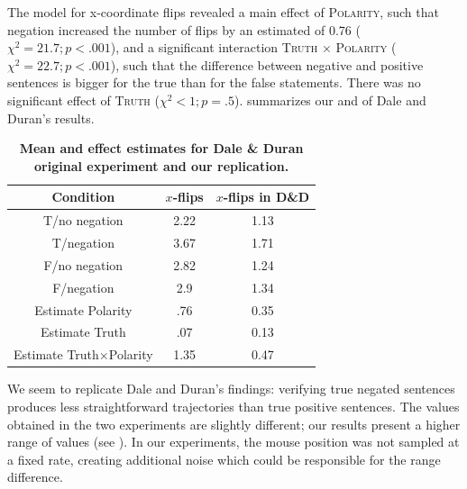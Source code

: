 \documentclass[11pt]{article}
\begin{document}

The model for x-coordinate flips revealed a main effect of \textsc{Polarity}, such that negation increased the number of flips by an estimated of 0.76 ($\chi^{2}=21.7; p<.001$), and a significant interaction \textsc{Truth} $\times$ \textsc{Polarity} ($\chi^{2}=22.7; p<.001$), such that the difference between negative and positive sentences is bigger for the true than for the false statements. There was no significant effect of \textsc{Truth} ($\chi^{2}<1; p=.5$). 
 summarizes our and of Dale and Duran's results. 

\begin{table}[h]
\begin{center}
\begin{tabular}{ccc}
Condition & $x$-flips &  $x$-flips in D\&D \\
\hline
T/no negation & 2.22 & 1.13 \\
T/negation & 3.67 & 1.71 \\
F/no negation & 2.82 & 1.24 \\
F/negation & 2.9 & 1.34 \\
Estimate Polarity & .76 & 0.35 \\
Estimate Truth & .07 & 0.13 \\
Estimate Truth$\times$Polarity & 1.35 & 0.47\\
\end{tabular}
\caption{\textbf{Mean and effect estimates for Dale \& Duran original experiment and our replication.}}
\label{table:negationresults}
\end{center}
\end{table}%

We seem to replicate Dale and Duran's findings: verifying true negated sentences produces less straightforward trajectories than true positive sentences. The values obtained in the two experiments are slightly different; our results present a higher range of values (see ). 
In our experiments, the mouse position was not sampled at a fixed rate, creating additional noise which could be responsible for the range difference. 
\end{document}
